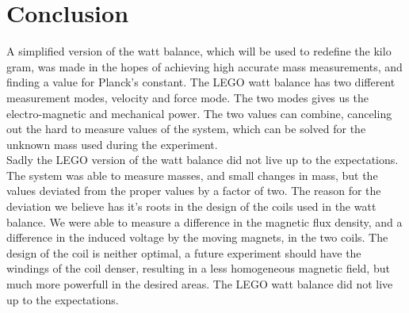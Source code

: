 \documentclass[english,a4paper,12pt,reprint]{revtex4-1}
\begin{document}
\section{Conclusion}
A simplified version of the watt balance, which will be used to redefine the kilo gram, was made in the hopes of achieving high accurate mass measurements, and finding a value for Planck's constant. The LEGO watt balance has two different measurement modes, velocity and force mode. The two modes gives us the electro-magnetic and mechanical power. The two values can combine, canceling out the hard to measure values of the system, which can be solved for the unknown mass used during the experiment.\\

Sadly the LEGO version of the watt balance did not live up to the expectations. The system was able to measure masses, and small changes in mass, but the values deviated from the proper values by a factor of two. The reason for the deviation we believe has it's roots in the design of the coils used in the watt balance. We were able to measure a difference in the magnetic flux density, and a difference in the induced voltage by the moving magnets, in the two coils. The design of the coil is neither optimal, a future experiment should have the windings of the coil denser, resulting in a less homogeneous magnetic field, but much more powerfull in the desired areas. The LEGO watt balance did not live up to the expectations.


{}
\end{document}
